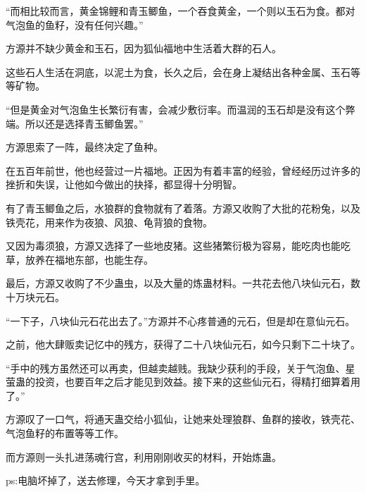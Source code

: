 \begin{this_body}
“而相比较而言，黄金锦鲤和青玉鲫鱼，一个吞食黄金，一个则以玉石为食。都对气泡鱼的鱼籽，没有任何兴趣。”

方源并不缺少黄金和玉石，因为狐仙福地中生活着大群的石人。

这些石人生活在洞底，以泥土为食，长久之后，会在身上凝结出各种金属、玉石等等矿物。

“但是黄金对气泡鱼生长繁衍有害，会减少敷衍率。而温润的玉石却是没有这个弊端。所以还是选择青玉鲫鱼罢。”

方源思索了一阵，最终决定了鱼种。

在五百年前世，他也经营过一片福地。正因为有着丰富的经验，曾经经历过许多的挫折和失误，让他如今做出的抉择，都显得十分明智。

有了青玉鲫鱼之后，水狼群的食物就有了着落。方源又收购了大批的花粉兔，以及铁壳花，用来作为夜狼、风狼、龟背狼的食物。

又因为毒须狼，方源又选择了一些地皮猪。这些猪繁衍极为容易，能吃肉也能吃草，放养在福地东部，也能生存。

最后，方源又收购了不少蛊虫，以及大量的炼蛊材料。一共花去他八块仙元石，数十万块元石。

“一下子，八块仙元石花出去了。”方源并不心疼普通的元石，但是却在意仙元石。

之前，他大肆贩卖记忆中的残方，获得了二十八块仙元石，如今只剩下二十块了。

“手中的残方虽然还可以再卖，但越卖越贱。我缺少获利的手段，关于气泡鱼、星萤蛊的投资，也要百年之后才能见到效益。接下来的这些仙元石，得精打细算着用了。”

方源叹了一口气，将通天蛊交给小狐仙，让她来处理狼群、鱼群的接收，铁壳花、气泡鱼籽的布置等等工作。

而方源则一头扎进荡魂行宫，利用刚刚收买的材料，开始炼蛊。

ps:电脑坏掉了，送去修理，今天才拿到手里。

\end{this_body}

